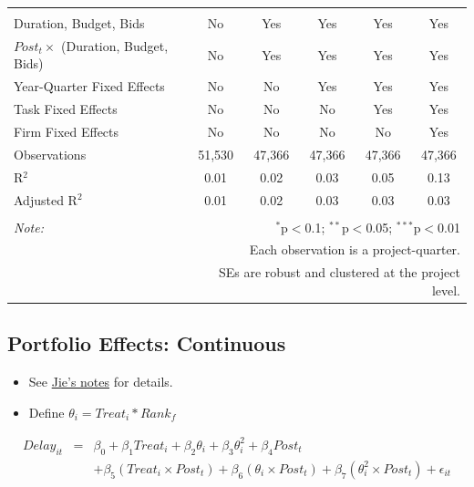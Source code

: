 \documentclass[
]{article}
\providecommand{\tightlist}{%
  \setlength{\itemsep}{0pt}\setlength{\parskip}{0pt}}
\begin{document}
\begin{table}[H]
\begin{tabular}{@{\extracolsep{-2pt}}lccccc}
  & & & & & \\ 
\hline \\[-1.8ex] 
Duration, Budget, Bids & No & Yes & Yes & Yes & Yes \\ 
$Post_t \times$  (Duration, Budget, Bids) & No & Yes & Yes & Yes & Yes \\ 
Year-Quarter Fixed Effects & No & No & Yes & Yes & Yes \\ 
Task Fixed Effects & No & No & No & Yes & Yes \\ 
Firm Fixed Effects & No & No & No & No & Yes \\ 
Observations & 51,530 & 47,366 & 47,366 & 47,366 & 47,366 \\ 
R$^{2}$ & 0.01 & 0.02 & 0.03 & 0.05 & 0.13 \\ 
Adjusted R$^{2}$ & 0.01 & 0.02 & 0.03 & 0.03 & 0.03 \\ 
\hline 
\hline \\[-1.8ex] 
\textit{Note:}  & \multicolumn{5}{r}{$^{*}$p$<$0.1; $^{**}$p$<$0.05; $^{***}$p$<$0.01} \\ 
 & \multicolumn{5}{r}{Each observation is a project-quarter.} \\ 
 & \multicolumn{5}{r}{SEs are robust and clustered at the project level.} \\ 
\end{tabular} 
\end{table}

\hypertarget{portfolio-effects-continuous}{%
\subsection{Portfolio Effects:
Continuous}\label{portfolio-effects-continuous}}

\begin{itemize}
\tightlist
\item
  See
  \href{https://github.com/QuickPay-Operational-Performance/Data-and-code/blob/master/notes/Portfolio\%20model\%2B0308.pdf}{Jie's
  notes} for details.
\item
  Define \(\theta_i = Treat_i*Rank_f\)
\end{itemize}

\[ \begin{aligned} Delay_{it} &=& \beta_0+\beta_1 Treat_i + \beta_2 \theta_i+\beta_3 \theta_i^2+\beta_4 Post_t\\&& + \beta_5 (Treat_i\times Post_t) + \beta_6 (\theta_i\times Post_t) +\beta_7 (\theta_i^2\times Post_t)+\epsilon_{it} \end{aligned} \]
\end{document}
